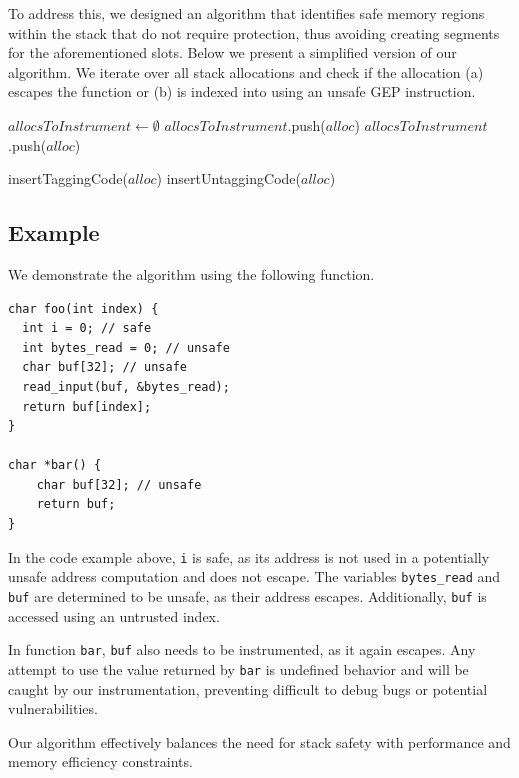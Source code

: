 To address this, we designed an algorithm that identifies safe memory regions within the stack that do not require protection, thus avoiding creating segments for the aforementioned slots.
Below we present a simplified version of our algorithm.
We iterate over all stack allocations and check if the allocation (a) escapes the function or (b) is indexed into using an unsafe \ac{GEP} instruction.

\begin{algorithmic}
    \State $allocsToInstrument \gets \emptyset$
            \State $allocsToInstrument$.push($alloc$)
        \EndIf
            \State $allocsToInstrument$.push($alloc$)
        \EndIf
    \EndFor

        \State insertTaggingCode($alloc$)
        \State insertUntaggingCode($alloc$)
    \EndFor
\end{algorithmic}

\subsection{Example}
\label{subsec:example2}

We demonstrate the algorithm using the following function.

\begin{lstlisting}[frame=h,style=customc,
    label={lst:stack-safety}]
char foo(int index) {
  int i = 0; // safe
  int bytes_read = 0; // unsafe
  char buf[32]; // unsafe
  read_input(buf, &bytes_read);
  return buf[index];
}

char *bar() {
    char buf[32]; // unsafe
    return buf;
}
\end{lstlisting}

In the code example above, \texttt{i} is safe, as its address is not used in a potentially unsafe address computation and does not escape.
The variables \texttt{bytes\_read} and \texttt{buf} are determined to be unsafe, as their address escapes.
Additionally, \texttt{buf} is accessed using an untrusted index.

In function \texttt{bar}, \texttt{buf} also needs to be instrumented, as it again escapes.
Any attempt to use the value returned by \texttt{bar} is undefined behavior and will be caught by our instrumentation, preventing difficult to debug bugs or potential vulnerabilities.

\noindent
Our algorithm effectively balances the need for stack safety with performance and memory efficiency constraints.


